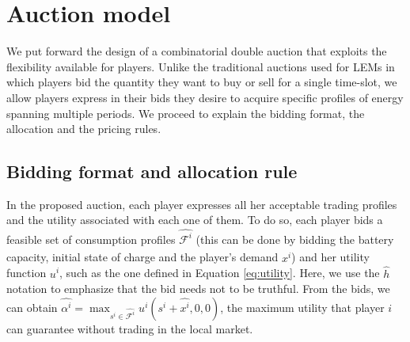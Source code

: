 \documentclass[runningheads]{llncs}
\newcommand{\li}[1][]{x^i_{#1}}
\newcommand{\bai}[1][]{s^i_{#1}}
\newcommand{\ci}[1][]{C^i_{#1}}
\newcommand{\fsi}{\mathcal{F}^i}
\newcommand{\guari}{\alpha^i}
\newcommand{\gaini}[1][]{\mathcal{P}^i_{#1}}
\newcommand{\uti}{u^i}
\begin{document}



\section{Auction model}

We put forward the design of a combinatorial double auction that exploits the flexibility available for players. Unlike the traditional auctions used for LEMs in which players bid the quantity they want to buy or sell for a single time-slot, we allow players express in their bids they desire to acquire specific profiles of energy spanning multiple periods. We proceed to explain the bidding format, the allocation and the pricing rules. 



\subsection{Bidding format and allocation rule}


In the proposed auction, each player expresses all her acceptable trading profiles and the utility associated with each one of them. To do so, each player bids a feasible set of consumption profiles $\hat{\fsi}$ (this can be done by bidding the battery capacity, initial state of charge and the player's demand $\hat{\li}$) and her utility function $\uti$, such as the one defined in Equation \eqref{eq:utility}. 
Here, we use the $\hat{h}$ notation to emphasize that the bid needs not to be truthful. From the bids, we can obtain $\displaystyle \hat{\guari} = \max_{\bai \in \hat{\fsi}} \uti(\bai + \hat{\li}, 0, 0)$, the maximum utility that player $i$ can guarantee without trading in the local market.
\end{document}
